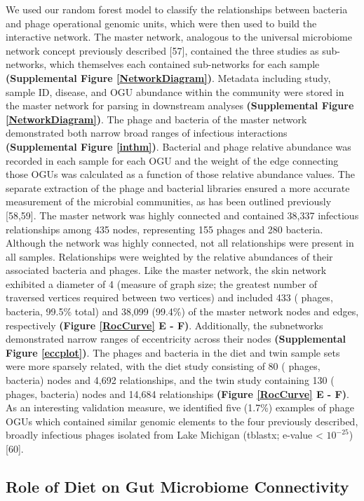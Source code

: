 \documentclass[12pt,]{article}
\begin{document}
We used our random forest model to classify the relationships between
bacteria and phage operational genomic units, which were then used to
build the interactive network. The master network, analogous to the
universal microbiome network concept previously described {[}57{]},
contained the three studies as sub-networks, which themselves each
contained sub-networks for each sample \textbf{(Supplemental Figure
\ref{NetworkDiagram})}. Metadata including study, sample ID, disease,
and OGU abundance within the community were stored in the master network
for parsing in downstream analyses \textbf{(Supplemental Figure
\ref{NetworkDiagram})}. The phage and bacteria of the master network
demonstrated both narrow broad ranges of infectious interactions
\textbf{(Supplemental Figure \ref{inthm})}. Bacterial and phage relative
abundance was recorded in each sample for each OGU and the weight of the
edge connecting those OGUs was calculated as a function of those
relative abundance values. The separate extraction of the phage and
bacterial libraries ensured a more accurate measurement of the microbial
communities, as has been outlined previously {[}58,59{]}. The master
network was highly connected and contained 38,337 infectious
relationships among 435 nodes, representing 155 phages and 280 bacteria.
Although the network was highly connected, not all relationships were
present in all samples. Relationships were weighted by the relative
abundances of their associated bacteria and phages. Like the master
network, the skin network exhibited a diameter of 4 (measure of graph
size; the greatest number of traversed vertices required between two
vertices) and included 433 ( phages, bacteria, 99.5\% total) and 38,099
(99.4\%) of the master network nodes and edges, respectively
\textbf{(Figure \ref{RocCurve} E - F)}. Additionally, the subnetworks
demonstrated narrow ranges of eccentricity across their nodes
\textbf{(Supplemental Figure \ref{eccplot})}. The phages and bacteria in
the diet and twin sample sets were more sparsely related, with the diet
study consisting of 80 ( phages, bacteria) nodes and 4,692
relationships, and the twin study containing 130 ( phages, bacteria)
nodes and 14,684 relationships \textbf{(Figure \ref{RocCurve} E - F)}.
As an interesting validation measure, we identified five (1.7\%)
examples of phage OGUs which contained similar genomic elements to the
four previously described, broadly infectious phages isolated from Lake
Michigan (tblastx; e-value \textless{} \(10^{-25}\)) {[}60{]}.

\subsection{Role of Diet on Gut Microbiome
Connectivity}\label{role-of-diet-on-gut-microbiome-connectivity}
\end{document}

